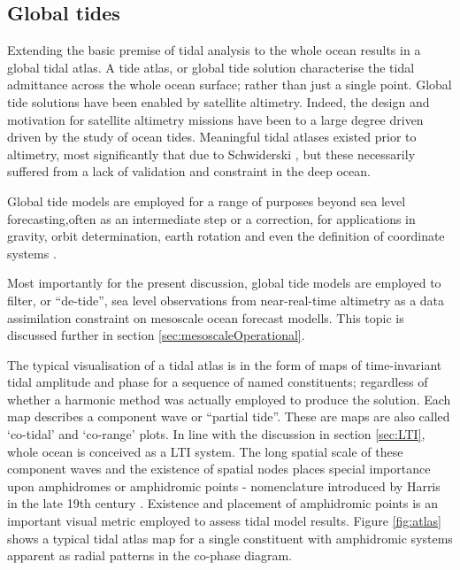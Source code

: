 \subsection{Global tides}
\label{sec:spatialTides}
Extending the basic premise of tidal analysis to the whole ocean results in a global tidal atlas.  A tide atlas, or global tide solution characterise the tidal admittance across the whole ocean surface; rather than just a single point.
Global tide solutions have been enabled by satellite altimetry.
Indeed, the design and motivation for satellite altimetry missions have been to a large degree driven driven by the study of ocean tides.
Meaningful tidal atlases existed prior to altimetry, most significantly that due to Schwiderski \citep{Schwiderski:1983ke}, but these necessarily suffered from a lack of validation and constraint in the deep ocean.


Global tide models are employed for a range of purposes beyond sea level forecasting,often as an intermediate step or a correction, for applications in gravity, orbit determination, earth rotation and even the definition of coordinate systems \citep{IERS2003}.

Most importantly for the present discussion, global tide models are employed to filter, or ``de-tide'', sea level observations from near-real-time altimetry as a data assimilation constraint on mesoscale ocean forecast modells.   This topic is discussed further in section \ref{sec:mesoscaleOperational}.


The typical visualisation of a tidal atlas is in the form of maps of time-invariant tidal amplitude and phase for a sequence of named constituents; regardless of whether a harmonic method was actually employed to produce the solution.   Each map describes a component wave or ``partial tide''.  These are maps are also called `co-tidal' and `co-range' plots.
In line with the discussion in section \ref{sec:LTI}, whole ocean is conceived as a LTI system. 
The long spatial scale of these component waves and the existence of spatial nodes places special importance upon amphidromes or amphidromic points - nomenclature introduced by Harris in the late 19th century \citep[pp 119]{Cartwright:2000tt}.  Existence and placement of amphidromic points is an important visual metric employed to assess tidal model results.  
Figure \ref{fig:atlas} shows a typical tidal atlas map for a single constituent with amphidromic systems apparent as radial patterns in the co-phase diagram.

